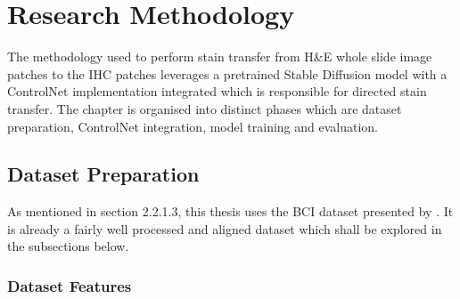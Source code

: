
\chapter{Research Methodology} %



\ifpdf
    \graphicspath{{4_ResearchMethodology/figures/PNG/}{4_ResearchMethodology/figures/PDF/}{4_ResearchMethodology/figures/}}
\else
    \graphicspath{{4_ResearchMethodology/figures/EPS/}{4_ResearchMethodology/figures/}}
\fi



The methodology used to perform stain transfer from H\&E whole slide image patches to the IHC patches leverages a pretrained Stable Diffusion model with a ControlNet implementation integrated which is responsible for directed stain transfer. The chapter is organised into distinct phases which are dataset preparation, ControlNet integration, model training and evaluation.

\section{Dataset Preparation}

As mentioned in section 2.2.1.3, this thesis uses the BCI dataset presented by \parencite{Liu2022BCI:Pix2pix}. It is already a fairly well processed and aligned dataset which shall be explored in the subsections below.

\subsection{Dataset Features}

